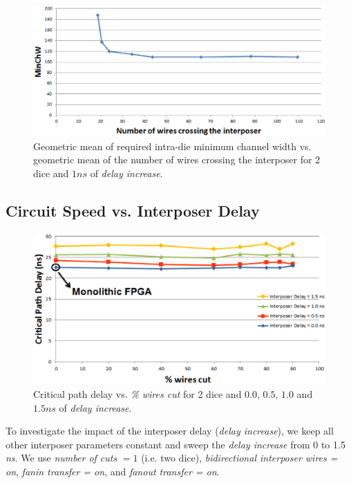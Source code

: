 \documentclass{sig-alternate-2013}
\begin{document}
\begin{figure}[!t]
\centering
\includegraphics[width=\linewidth]{numberofcrossingwires_new.eps}
\caption{Geometric mean of required intra-die minimum channel width vs. geometric mean of the number of wires crossing the interposer for 2 dice and $1ns$ of \textit{delay increase}.}
\label{fig:crossingwires}
\end{figure}

\subsection{Circuit Speed vs. Interposer Delay}

\begin{figure}[!b]
\centering
\includegraphics[width=\linewidth]{delays_crit_path_new.eps}
\caption{Critical path delay vs. \textit{\% wires cut} for 2 dice and $0.0$, $0.5$, $1.0$ and $1.5ns$ of \textit{delay increase}.}
\label{fig:delays_crit}
\end{figure}

To investigate the impact of the interposer delay (\textit{delay increase}), we keep all other interposer parameters constant and sweep the \textit{delay increase} from 0 to 1.5 \textit{ns}. We use \textit{number of cuts} $= 1$ (i.e. two dice), \textit{bidirectional interposer wires = on}, \textit{fanin transfer = on}, and \textit{fanout transfer = on}.
\end{document}
